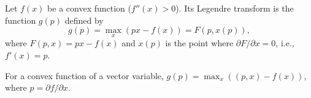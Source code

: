 Let $f(x)$ be a convex function ($f''(x) > 0$). Its Legendre transform is the function $g(p)$ defined by
$$g(p) = \max_x (px - f(x)) = F(p, x(p)),$$
where $F(p, x) = px - f(x)$ and $x(p)$ is the point where $\partial F/\partial x = 0$, i.e., $f'(x) = p$.

For a convex function of a vector variable, $g(p) = \max_x ((p, x) - f(x))$, where $p = \partial f/\partial x$.
